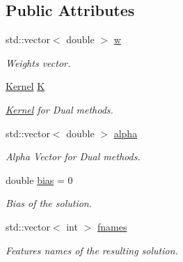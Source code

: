 \subsection*{Public Attributes}
\begin{DoxyCompactItemize}
\item 
\mbox{\label{class_solution_a736054c66aab1014bba4a71de293ad2f}} 
std\+::vector$<$ double $>$ \hyperlink{class_solution_a736054c66aab1014bba4a71de293ad2f}{w}
\begin{DoxyCompactList}\small\item\em Weights vector. \end{DoxyCompactList}\item 
\mbox{\label{class_solution_af63bb12412227102794729af7491e9db}} 
\hyperlink{class_kernel}{Kernel} \hyperlink{class_solution_af63bb12412227102794729af7491e9db}{K}
\begin{DoxyCompactList}\small\item\em \hyperlink{class_kernel}{Kernel} for Dual methods. \end{DoxyCompactList}\item 
\mbox{\label{class_solution_ab764f08c5e77a03f709dd56529cbf830}} 
std\+::vector$<$ double $>$ \hyperlink{class_solution_ab764f08c5e77a03f709dd56529cbf830}{alpha}
\begin{DoxyCompactList}\small\item\em Alpha Vector for Dual methods. \end{DoxyCompactList}\item 
\mbox{\label{class_solution_ac0a589a77d238aecf14c91f55d1b8daa}} 
double \hyperlink{class_solution_ac0a589a77d238aecf14c91f55d1b8daa}{bias} = 0
\begin{DoxyCompactList}\small\item\em Bias of the solution. \end{DoxyCompactList}\item 
\mbox{\label{class_solution_a86d40d16bfa9e7dbe476a62008431987}} 
std\+::vector$<$ int $>$ \hyperlink{class_solution_a86d40d16bfa9e7dbe476a62008431987}{fnames}
\begin{DoxyCompactList}\small\item\em Features names of the resulting solution. \end{DoxyCompactList}\item 

\end{DoxyCompactItemize}
